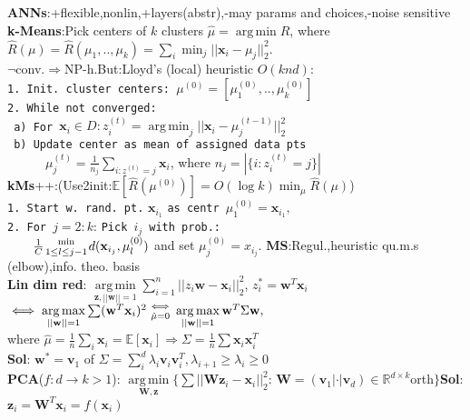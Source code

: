 \documentclass[11pt]{article}
\newcommand{\bv}[1]{\mathbf{#1}}
\newcommand{\R}{\mathbb{R}}
\newcommand{\E}{\mathbb{E}}
\DeclareMathOperator*{\argmax}{arg\,max}
\DeclareMathOperator*{\argmin}{arg\,min}
\begin{document}
\begin{multicols}{4}
\textbf{ANNs}:+flexible,nonlin,+layers(abstr),-may params and choices,-noise sensitive\\
\textbf{k-Means}:Pick centers of $k$ clusters $\hat{\mu}=\argmin\hat{R}$, where $\hat{R}(\mu)=\hat{R}(\mu_1,..,\mu_k)=\sum_i\min_j ||\bv{x}_i-\mu_j||^2_2.$\\
$\neg$conv.$\Rightarrow$NP-h.But:Lloyd's (local) heuristic $O(knd):$\\
\verb|1. Init. cluster centers: |$\mu^{(0)}=[\mu_1^{(0)},..,\mu_k^{(0)}]$\\
\verb|2. While not converged:|\\
\verb| a) For |$\bv{x}_i\in D: z_i^{(t)}=\argmin_j||\bv{x}_i-\mu_j^{(t-1)}||^2_2$\\
\verb| b) Update center as mean of assigned data pts|\\
\ \ \ \ \ \ $\mu_j^{(t)}=\frac{1}{n_j}\sum\limits_{i:z^{(t)}=j}\bv{x}_i$, where $n_j=|\{i:z_i^{(t)}=j\}|$\\
\textbf{kMs}++:(Use2init:$\E[\hat{R}(\mu^{(0)})]=O(\log k)\min_\mu\hat{R}(\mu)$)\\
\verb|1. Start w. rand. pt.| $\bv{x}_{i_1}$ \verb|as centr |$\mu^{(0)}_1=\bv{x}_{i_1},$\\
\verb|2. For |$j=2:k$: \verb|Pick |$i_j$\verb| with prob.:|\\
\ \ \ \ $\frac{1}{C}\genfrac{}{}{0pt}{}{\min}{1\leq l\leq j-1} d(\bv{x}_{i_j},\mu_l^{(0)})$ and set $\mu_j^{(0)}=x_{i_j}.$
\textbf{MS}:Regul.,heuristic qu.m.s (elbow),info. theo. basis\\
\textbf{Lin dim red}: $\argmin\limits_{\bv{z},||\bv{w}||=1}\sum\limits^n_{i=1}||z_i\bv{w}-\bv{x}_i||^2_2$, $z_i^*=\bv{w}^T\bv{x}_i$\\
$\iff \argmax\limits_{||\bv{w}||=1}\sum(\bv{w}^T\bv{x}_i)^2\genfrac{}{}{0pt}{}{\iff}{\hat{\mu}=0}\argmax\limits_{||\bv{w}||=1}\bv{w}^T\Sigma\bv{w},$\\
where $\hat{\mu}=\frac{1}{n}\sum_i\bv{x}_i=\E[\bv{x}_i]\Rightarrow\Sigma=\frac{1}{n}\sum\bv{x}_i\bv{x}_i^T$\\
\textbf{Sol}: $\bv{w}^* =\bv{v}_1$ of $\Sigma=\sum^d_i \lambda_i \bv{v}_i \bv{v}_i^T,\lambda_{i+1}\geq\lambda_i\geq0$\\
\textbf{PCA}($f:d\rightarrow k>1$): $\argmin\limits_{\bv{W},\bv{z}}\{\sum||\bv{W}\bv{z}_i-\bv{x}_i||^2_2
$: $\bv{W}=(\bv{v}_1|\cdot|\bv{v}_d)\in\R^{d\times k}$orth$\}$\textbf{Sol}:$\bv{z}_i=\bv{W}^T\bv{x}_i=f(\bv{x}_i)$\\

\end{multicols}
\end{document}
